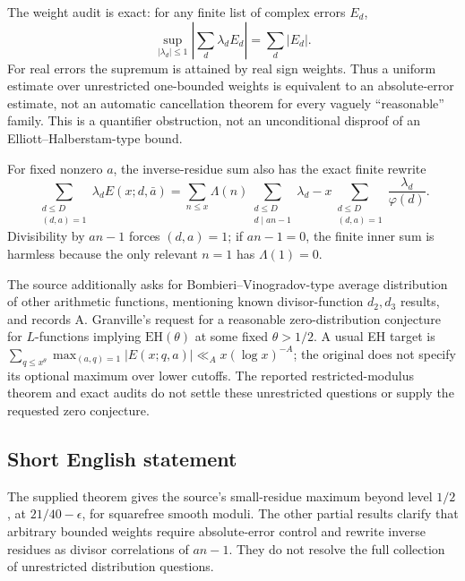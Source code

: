 \documentclass[11pt]{article}
\begin{document}
The weight audit is exact: for any finite list of complex errors \(E_d\),
\[
 \sup_{|\lambda_d|\leq1}\left|\sum_d\lambda_dE_d\right|=\sum_d|E_d|.
\]
For real errors the supremum is attained by real sign weights. Thus a uniform estimate over unrestricted one-bounded weights is equivalent to an absolute-error estimate, not an automatic cancellation theorem for every vaguely ``reasonable'' family. This is a quantifier obstruction, not an unconditional disproof of an Elliott--Halberstam-type bound.

For fixed nonzero \(a\), the inverse-residue sum also has the exact finite rewrite
\[
 \sum_{\substack{d\leq D\\(d,a)=1}}\lambda_d E(x;d,\bar a)
 =\sum_{n\leq x}\Lambda(n)\sum_{\substack{d\leq D\\d\mid an-1}}\lambda_d
 -x\sum_{\substack{d\leq D\\(d,a)=1}}\frac{\lambda_d}{\varphi(d)}.
\]
Divisibility by \(an-1\) forces \((d,a)=1\); if \(an-1=0\), the finite inner sum is harmless because the only relevant \(n=1\) has \(\Lambda(1)=0\).

The source additionally asks for Bombieri--Vinogradov-type average distribution of other arithmetic functions, mentioning known divisor-function \(d_2,d_3\) results, and records A. Granville's request for a reasonable zero-distribution conjecture for \(L\)-functions implying \(\mathrm{EH}(\theta)\) at some fixed \(\theta>1/2\). A usual EH target is \(\sum_{q\leq x^\theta}\max_{(a,q)=1}|E(x;q,a)|\ll_Ax(\log x)^{-A}\); the original does not specify its optional maximum over lower cutoffs. The reported restricted-modulus theorem and exact audits do not settle these unrestricted questions or supply the requested zero conjecture.
\subsection{Short English statement}
The supplied theorem gives the source's small-residue maximum beyond level \(1/2\), at \(21/40-\epsilon\), for squarefree smooth moduli. The other partial results clarify that arbitrary bounded weights require absolute-error control and rewrite inverse residues as divisor correlations of \(an-1\). They do not resolve the full collection of unrestricted distribution questions.
\end{document}
